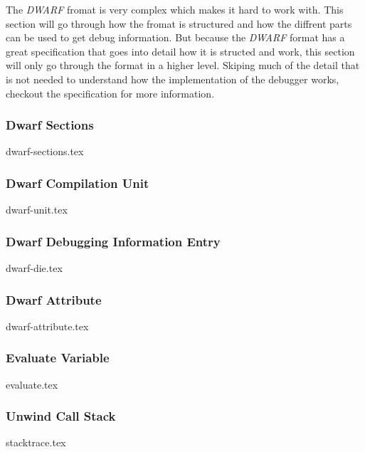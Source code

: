  


The \emph{DWARF} fromat is very complex which makes it hard to work with.
This section will go through how the fromat is structured and how the diffrent parts can be used to get debug information.
But because the \emph{DWARF} format has a great specification that goes into detail how it is structed and work, this section will only go through the format in a higher level.
Skiping much of the detail that is not needed to understand how the implementation of the debugger works, checkout the specification \cite{dwarf} for more information.


\subsubsection{Dwarf Sections}
{dwarf-sections.tex}


\subsubsection{Dwarf Compilation Unit}
{dwarf-unit.tex}


\subsubsection{Dwarf Debugging Information Entry}
{dwarf-die.tex}


\subsubsection{Dwarf Attribute}
{dwarf-attribute.tex}


\subsubsection{Evaluate Variable}
{evaluate.tex}


\subsubsection{Unwind Call Stack}
{stacktrace.tex}

